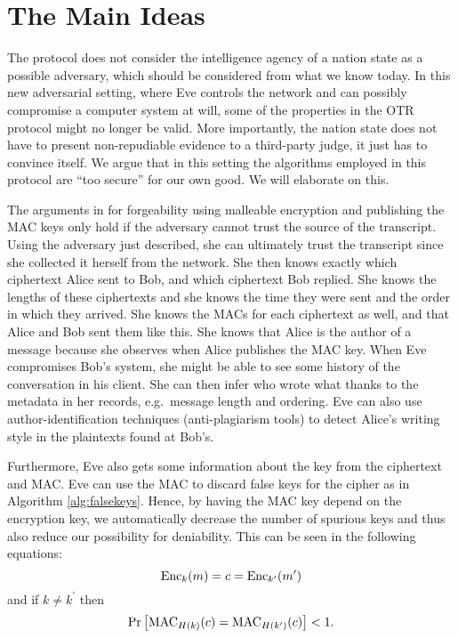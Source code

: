 \section{The Main Ideas}

The protocol does not consider the intelligence agency of a nation state as 
a possible adversary, which should be considered from what we know today.
In this new adversarial setting, where Eve controls the network and can 
possibly compromise a computer system at will, some of the properties in the 
\ac{OTR} protocol might no longer be valid.
More importantly, the nation state does not have to present non-repudiable 
evidence to a third-party judge, it just has to convince itself.
We argue that in this setting the algorithms employed in this protocol are 
\enquote{too secure} for our own good.
We will elaborate on this.

The arguments in \cite{otr2004} for forgeability using malleable encryption and 
publishing the \ac{MAC} keys only hold if the adversary cannot trust the source 
of the transcript.
Using the adversary just described, she can ultimately trust the transcript 
since she collected it herself from the network.
She then knows exactly which ciphertext Alice sent to Bob, and which ciphertext 
Bob replied.
She knows the lengths of these ciphertexts and she knows the time they were 
sent and the order in which they arrived.
She knows the \acp{MAC} for each ciphertext as well, and that Alice and Bob 
sent them like this.
She knows that Alice is the author of a message because she observes when Alice 
publishes the \ac{MAC} key.
When Eve compromises Bob's system, she might be able to see some history of the 
conversation in his client.
She can then infer who wrote what thanks to the metadata in her records, e.g.\ 
message length and ordering.
Eve can also use author-identification techniques (anti-plagiarism tools) to 
detect Alice's writing style in the plaintexts found at Bob's.

Furthermore, Eve also gets some information about the key from the ciphertext 
and \ac{MAC}.
Eve can use the \ac{MAC} to discard false keys for the cipher as in Algorithm 
\ref{alg:falsekeys}.
Hence, by having the \ac{MAC} key depend on the encryption key, we 
automatically decrease the number of spurious keys and thus also reduce our 
possibility for deniability.
This can be seen in the following equations:
\begin{equation*}
  \operatorname{\mathrm{Enc}}_k( m ) = c = \operatorname{\mathrm{Enc}}_{k^\prime}( m^\prime )
\end{equation*}
and if \(k\neq k^\prime\) then
\begin{equation*}
  \Pr\left[
    \operatorname{\mathrm{MAC}}_{H(k)}( c ) = \operatorname{\mathrm{MAC}}_{H(k^\prime)}( c )
  \right] < 1.
\end{equation*}

